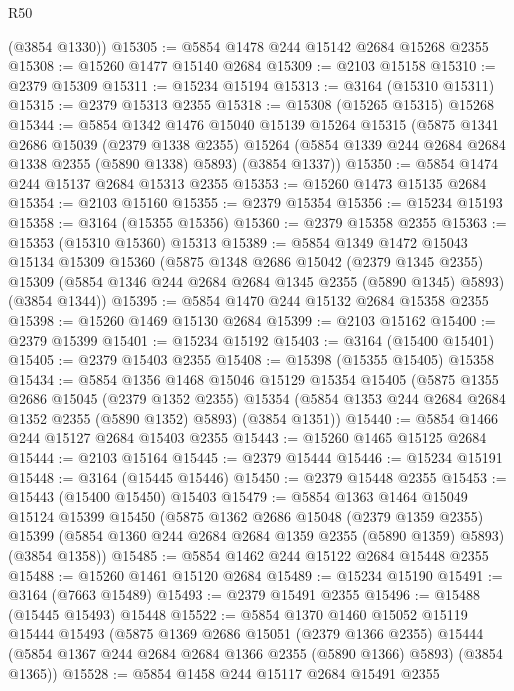 \begin{lexlean}{R50}
\begin{coremodule}
      (@3854 @1330))
@15305 := @5854 @1478 @244 @15142 @2684 @15268 @2355
@15308 := @15260 @1477 @15140 @2684
@15309 := @2103 @15158
@15310 := @2379 @15309
@15311 := @15234 @15194
@15313 := @3164 (@15310 @15311)
@15315 := @2379 @15313 @2355
@15318 := @15308 (@15265 @15315) @15268
@15344 := @5854
    @1342
    @1476
    @15040
    @15139
    @15264
    @15315
    (@5875
      @1341
      @2686
      @15039
      (@2379 @1338 @2355)
      @15264
      (@5854 @1339 @244 @2684 @2684 @1338 @2355 (@5890 @1338) @5893)
      (@3854 @1337))
@15350 := @5854 @1474 @244 @15137 @2684 @15313 @2355
@15353 := @15260 @1473 @15135 @2684
@15354 := @2103 @15160
@15355 := @2379 @15354
@15356 := @15234 @15193
@15358 := @3164 (@15355 @15356)
@15360 := @2379 @15358 @2355
@15363 := @15353 (@15310 @15360) @15313
@15389 := @5854
    @1349
    @1472
    @15043
    @15134
    @15309
    @15360
    (@5875
      @1348
      @2686
      @15042
      (@2379 @1345 @2355)
      @15309
      (@5854 @1346 @244 @2684 @2684 @1345 @2355 (@5890 @1345) @5893)
      (@3854 @1344))
@15395 := @5854 @1470 @244 @15132 @2684 @15358 @2355
@15398 := @15260 @1469 @15130 @2684
@15399 := @2103 @15162
@15400 := @2379 @15399
@15401 := @15234 @15192
@15403 := @3164 (@15400 @15401)
@15405 := @2379 @15403 @2355
@15408 := @15398 (@15355 @15405) @15358
@15434 := @5854
    @1356
    @1468
    @15046
    @15129
    @15354
    @15405
    (@5875
      @1355
      @2686
      @15045
      (@2379 @1352 @2355)
      @15354
      (@5854 @1353 @244 @2684 @2684 @1352 @2355 (@5890 @1352) @5893)
      (@3854 @1351))
@15440 := @5854 @1466 @244 @15127 @2684 @15403 @2355
@15443 := @15260 @1465 @15125 @2684
@15444 := @2103 @15164
@15445 := @2379 @15444
@15446 := @15234 @15191
@15448 := @3164 (@15445 @15446)
@15450 := @2379 @15448 @2355
@15453 := @15443 (@15400 @15450) @15403
@15479 := @5854
    @1363
    @1464
    @15049
    @15124
    @15399
    @15450
    (@5875
      @1362
      @2686
      @15048
      (@2379 @1359 @2355)
      @15399
      (@5854 @1360 @244 @2684 @2684 @1359 @2355 (@5890 @1359) @5893)
      (@3854 @1358))
@15485 := @5854 @1462 @244 @15122 @2684 @15448 @2355
@15488 := @15260 @1461 @15120 @2684
@15489 := @15234 @15190
@15491 := @3164 (@7663 @15489)
@15493 := @2379 @15491 @2355
@15496 := @15488 (@15445 @15493) @15448
@15522 := @5854
    @1370
    @1460
    @15052
    @15119
    @15444
    @15493
    (@5875
      @1369
      @2686
      @15051
      (@2379 @1366 @2355)
      @15444
      (@5854 @1367 @244 @2684 @2684 @1366 @2355 (@5890 @1366) @5893)
      (@3854 @1365))
@15528 := @5854 @1458 @244 @15117 @2684 @15491 @2355

\end{coremodule}
\end{lexlean}
